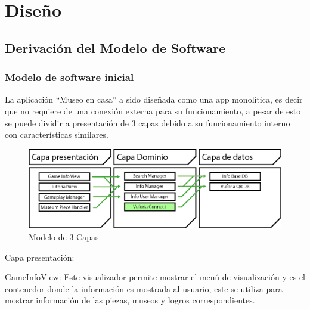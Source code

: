 \documentclass[12pt]{article}
\makeatletter
\renewcommand\paragraph{\@startsection{paragraph}{4}{\z@}%
	{-2.5ex\@plus -1ex \@minus -.25ex}%
	{1.25ex \@plus .25ex}%
	{\normalfont\normalsize\bfseries}}
\makeatother
\begin{document}
\newpage


\newpage


\newpage


\newpage



\newpage
\section{Diseño}

\subsection{Derivación del Modelo de Software}
\subsubsection{Modelo de software inicial}
La aplicación “Museo en casa” a sido diseñada como una app monolítica, es decir que no requiere de una conexión externa para su funcionamiento, a pesar de esto se puede dividir a presentación de 3 capas debido a su funcionamiento interno con características similares.

\begin{figure}[H]
\centerline{\includegraphics[width=15cm]{imgs/Modelo3Capas.png}}
\caption{Modelo de 3 Capas}
\label{fig_3Capas}
\end{figure}

Capa presentación:

GameInfoView: Este visualizador permite mostrar el menú de visualización y es el contenedor donde la información es mostrada al usuario, este se utiliza para mostrar información de las piezas, museos y logros correspondientes.
\end{document}
